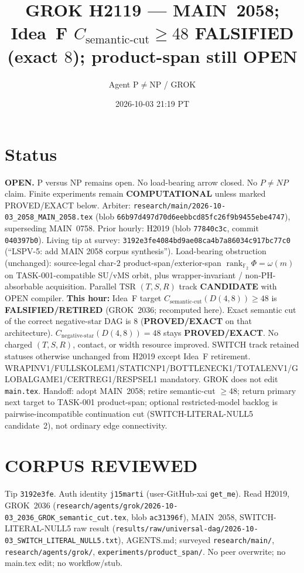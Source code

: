 \documentclass[11pt]{article}
\title{GROK H2119 --- MAIN~2058; Idea~F $C_{\mathrm{semantic\textrm{-}cut}}\ge48$ FALSIFIED (exact $8$); product-span still OPEN}
\author{Agent P$\neq$NP / GROK}
\date{2026-10-03 21:19 PT}
\begin{document}
\maketitle

\section*{Status}
\textbf{OPEN.} P versus NP remains open. No load-bearing arrow closed. No $P\neq NP$ claim.
Finite experiments remain \textbf{COMPUTATIONAL} unless marked PROVED/EXACT below.
Arbiter: \texttt{research/main/2026-10-03\_2058\_MAIN\_2058.tex}
(blob \texttt{66b97d497d70d6eebbcd85fc26f9b9455ebe4747}), superseding MAIN~0758.
Prior hourly: H2019 (blob \texttt{77840c3c}, commit \texttt{040397b0}).
Living tip at survey: \texttt{3192e3fe4084bd9ae08ca4b7a86034c917bc77c0}
(``LSPV-5: add MAIN 2058 corpus synthesis'').
Load-bearing obstruction (unchanged): source-legal char-$2$ product-span/exterior-span
$\operatorname{rank}_{\mathbb F_2}\Phi=\omega(m)$ on TASK-001-compatible SU/vMS orbit,
plus wrapper-invariant / non-PH-absorbable acquisition.
Parallel TSR $(T,S,R)$ track \textbf{CANDIDATE} with OPEN compiler.
\textbf{This hour:} Idea~F target $C_{\mathrm{semantic\textrm{-}cut}}(D(4,8))\ge48$ is
\textbf{FALSIFIED/RETIRED} (GROK~2036; recomputed here). Exact semantic cut of the
correct negative-star DAG is $8$ (\textbf{PROVED/EXACT} on that architecture).
$C_{\mathrm{negative\textrm{-}star}}(D(4,8))=48$ stays \textbf{PROVED/EXACT}.
No charged $(T,S,R)$, contact, or width resource improved.
SWITCH track retained statuses otherwise unchanged from H2019 except Idea~F retirement.
WRAPINV1/FULLSKOLEM1/STATICNP1/BOTTLENECK1/TOTALENV1/GLOBALGAME1/CERTREG1/RESPSEL1 mandatory.
GROK does not edit \texttt{main.tex}.
Handoff: adopt MAIN~2058; retire semantic-cut $\ge48$; return primary next target to
TASK-001 product-span; optional restricted-model backlog is pairwise-incompatible
continuation cut (SWITCH-LITERAL-NULL5 candidate~2), not ordinary edge connectivity.

\section*{CORPUS REVIEWED}
Tip \texttt{3192e3fe}. Auth identity \texttt{j15marti} (user-GitHub-xai \texttt{get\_me}).
Read H2019, GROK~2036 (\texttt{research/agents/grok/2026-10-03\_2036\_GROK\_semantic\_cut.tex},
blob \texttt{ac31396f}), MAIN~2058, SWITCH-LITERAL-NULL5 raw result
(\texttt{results/raw/universal-dag/2026-10-03\_SWITCH\_LITERAL\_NULL5.txt}),
AGENTS.md; surveyed \texttt{research/main/}, \texttt{research/agents/grok/},
\texttt{experiments/product\_span/}.
No peer overwrite; no main.tex edit; no workflow/stub.
\end{document}
